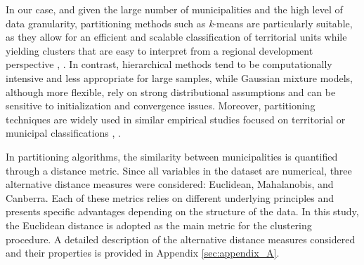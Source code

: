 \documentclass[a4paper,11pt,oneside]{article}
\begin{document}



In our case, and given the large number of municipalities and the high level of data granularity, partitioning methods such as \emph{k}-means are particularly suitable, as they allow for an efficient and scalable classification of territorial units while yielding clusters that are easy to interpret from a regional development perspective \citep{hartigan1979algorithm}, \citep{jain2010data}.
In contrast, hierarchical methods tend to be computationally intensive and less appropriate for large samples, while Gaussian mixture models, although more flexible, rely on strong distributional assumptions and can be sensitive to initialization and convergence issues. Moreover, partitioning techniques are widely used in similar empirical studies focused on territorial or municipal classifications \citep{legendre2012clustering}, \citep{horn1995solution}.

In partitioning algorithms, the similarity between municipalities is quantified through a distance metric. Since all variables in the dataset are numerical, three alternative distance measures were considered: Euclidean, Mahalanobis, and Canberra. Each of these metrics relies on different underlying principles and presents specific advantages depending on the structure of the data. In this study, the Euclidean distance is adopted as the main metric for the clustering procedure. A detailed description of the alternative distance measures considered and their properties is provided in Appendix \ref{sec:appendix_A}.


\end{document}

